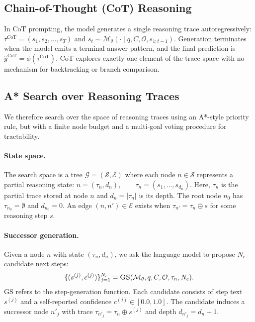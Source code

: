 \documentclass[10pt]{article}
\begin{document}
\subsection{Chain-of-Thought (CoT) Reasoning}
\label{sec:cot}

In CoT prompting, the model generates a single reasoning trace autoregressively: $\tau^{\text{CoT}} = (s_1, s_2, \ldots, s_T)$ and $s_t \sim \mathcal{M}_\theta(\cdot \mid q, C, \mathcal{O}, s_{1:t-1})$.
Generation terminates when the model emits a terminal answer pattern, and the final prediction is $\hat{y}^{\text{CoT}} = \phi(\tau^{\text{CoT}})$. CoT explores exactly one element of the trace space with no mechanism for backtracking or branch comparison.

\subsection{A* Search over Reasoning Traces}
\label{sec:astar}

We therefore search over the space of reasoning traces using an A*-style priority rule, but with a finite node budget and a multi-goal voting procedure for tractability.

\paragraph{State space.}
The search space is a tree $\mathcal{G} = (\mathcal{S}, \mathcal{E})$ where each node $n \in \mathcal{S}$ represents a partial reasoning state: $n = (\tau_n, d_n), \qquad \tau_n = (s_1, \ldots, s_{d_n})$. Here, $\tau_n$ is the partial trace stored at node $n$ and $d_n = |\tau_n|$ is its depth. The root node $n_0$ has $\tau_{n_0} = \emptyset$ and $d_{n_0} = 0$. An edge $(n,n') \in \mathcal{E}$ exists when $\tau_{n'} = \tau_n \oplus s$ for some reasoning step $s$.

\paragraph{Successor generation.}
Given a node $n$ with state $(\tau_n, d_n)$, we ask the language model to propose $N_c$ candidate next steps:
\begin{equation}
\{(s^{(j)}, c^{(j)})\}_{j=1}^{N_c} = \textsc{GS}(\mathcal{M}_\theta, q, C, \mathcal{O}, \tau_n, N_c).
\label{eq:successor}
\end{equation}
\textsc{GS} refers to the step-generation function. Each candidate consists of step text $s^{(j)}$ and a self-reported confidence $c^{(j)} \in [0.0,1.0]$. The candidate induces a successor node $n'_j$ with trace $\tau_{n'_j} = \tau_n \oplus s^{(j)}$ and depth $d_{n'_j} = d_n + 1$.
\end{document}
